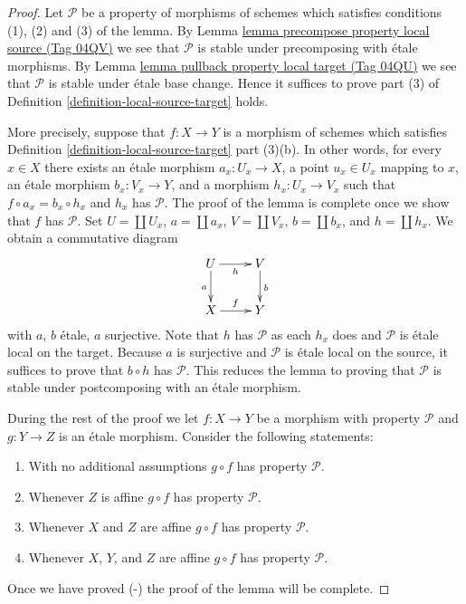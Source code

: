 \documentclass{amsart}
\theoremstyle{plain}
\theoremstyle{definition}
\theoremstyle{remark}
\numberwithin{equation}{subsection}
\begin{document}
\begin{proof}
Let $\mathcal{P}$ be a property of morphisms of schemes which
satisfies conditions (1), (2) and (3) of the lemma. By
Lemma \href{https://stacks.math.columbia.edu/tag/04QV}{lemma precompose property local source (Tag 04QV)}
we see that $\mathcal{P}$ is stable under precomposing with
\'etale morphisms. By
Lemma \href{https://stacks.math.columbia.edu/tag/04QU}{lemma pullback property local target (Tag 04QU)}
we see that $\mathcal{P}$ is stable under \'etale base change.
Hence it suffices to prove part (3) of
Definition \ref{definition-local-source-target}
holds.

\medskip\noindent
More precisely, suppose that $f : X \to Y$ is a morphism
of schemes which satisfies
Definition \ref{definition-local-source-target} part (3)(b).
In other words, for every $x \in X$ there exists an \'etale
morphism $a_x : U_x \to X$, a point $u_x \in U_x$ mapping to $x$,
an \'etale morphism $b_x : V_x \to Y$, and a morphism $h_x : U_x \to V_x$
such that $f \circ a_x = b_x \circ h_x$ and $h_x$ has $\mathcal{P}$.
The proof of the lemma is complete once we show that $f$ has $\mathcal{P}$.
Set $U = \coprod U_x$, $a = \coprod a_x$, $V = \coprod V_x$,
$b = \coprod b_x$, and $h = \coprod h_x$. We obtain a
commutative diagram
$$
\xymatrix{
U \ar[d]_a \ar[r]_h & V \ar[d]^b \\
X \ar[r]^f & Y
}
$$
with $a$, $b$ \'etale, $a$ surjective. Note that $h$ has $\mathcal{P}$
as each $h_x$ does and $\mathcal{P}$ is \'etale local on the target.
Because $a$ is surjective and $\mathcal{P}$ is \'etale local on the source,
it suffices to prove that $b \circ h$ has $\mathcal{P}$.
This reduces the lemma to proving that $\mathcal{P}$ is stable under
postcomposing with an \'etale morphism.

\medskip\noindent
During the rest of the proof we let $f : X \to Y$ be a
morphism with property $\mathcal{P}$ and $g : Y \to Z$ is an \'etale
morphism. Consider the following statements:
\begin{enumerate}
\item[(-)] With no additional assumptions $g \circ f$
has property $\mathcal{P}$.
\item[(A)] Whenever $Z$ is affine
$g \circ f$ has property $\mathcal{P}$.
\item[(AA)] Whenever $X$ and $Z$ are affine
$g \circ f$ has property $\mathcal{P}$.
\item[(AAA)] Whenever $X$, $Y$, and $Z$ are affine
$g \circ f$ has property $\mathcal{P}$.
\end{enumerate}
Once we have proved (-) the proof of the lemma will be complete.


\end{proof}
\end{document}

